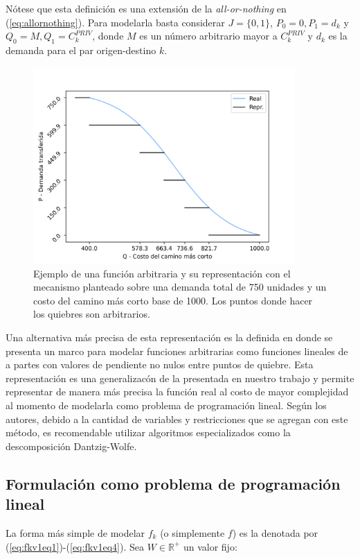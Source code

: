 Nótese que esta definición es una extensión de la {\it all-or-nothing} en (\ref{eq:allornothing}). Para modelarla basta considerar $J = \{0, 1\}$, $P_0 = 0, P_1 = d_k$ y $Q_0 = M, Q_1 = C^{PRIV}_k$, donde $M$ es un número arbitrario mayor a $C^{PRIV}_k$ y $d_k$ es la demanda para el par origen-destino $k$.

\begin{figure}[h!]
  \centering
  \includegraphics[width=10cm]{../resources/f_example.png}
  \caption{Ejemplo de una función arbitraria y su representación con el mecanismo planteado sobre una demanda total de 750 unidades y un costo del camino más corto base de 1000. Los puntos donde hacer los quiebres son arbitrarios.}
  \label{fig:fdrawexample}
\end{figure}

Una alternativa más precisa de esta representación es la definida en \textcite{crainic2021ch8} donde se presenta un marco para modelar funciones arbitrarias como funciones lineales de a partes con valores de pendiente no nulos entre puntos de quiebre. Esta representación es una generalizacón de la presentada en nuestro trabajo y permite representar de manera más precisa la función real al costo de mayor complejidad al momento de modelarla como problema de programación lineal. Según los autores, debido a la cantidad de variables y restricciones que se agregan con este método, es recomendable utilizar algoritmos especializados como la descomposición Dantzig-Wolfe.

\FloatBarrier
\subsection{Formulación como problema de programación lineal}

La forma más simple de modelar $f_k$ (o simplemente $f$) es la denotada por (\ref{eq:fkv1eq1})-(\ref{eq:fkv1eq4}). Sea $W \in \mathbb{R}^+$ un valor fijo:

